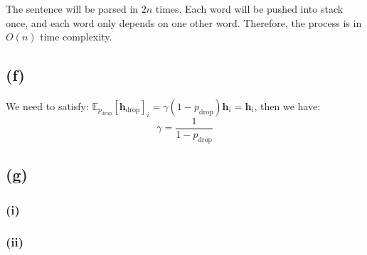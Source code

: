 \documentclass[12pt]{article}
\begin{document}
The sentence will be parsed in $2n$ times. Each word will be pushed into stack once, and each word only depends on one other word. Therefore, the process is in $O(n)$ time complexity.   

\subsection*{(f)}

We need to satisfy: 
$\mathbb{E}_{p_{\mathrm{drop}}}[\bm h_{\mathrm{drop}}]_i = \gamma (1-p_{\mathrm{drop}}) \bm h_i = \bm h_i$, then we have:  
                        $$\gamma = \frac{1}{1 - p_{\mathrm{drop}}}$$


\subsection*{(g)}
\subsubsection*{(i)}

\subsubsection*{(ii)}
\end{document}
